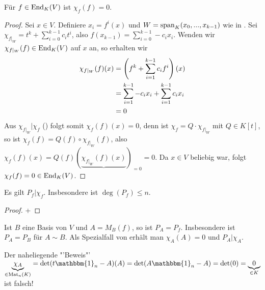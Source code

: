 \begin{theorem}
	Für $f\in\operatorname{End}_K(V)$ ist $\chi_f(f)=0$.
\end{theorem}
\begin{proof}
	Sei $x\in V$. Definiere $x_i=f^i(x)$ und $W=\operatorname{span}_K(x_0,...,x_{k-1})$ wie in . Sei $\chi_{f\vert_W}=t^k+\sum\limits_{i=0}^{k-1} c_it^i$, also $f(x_{k-1})=\sum\limits_{i=0}^{k-1} -c_ix_i$. Wenden wir $\chi_{f\vert_W}(f)\in\operatorname{End}_K(V)$ auf $x$ an, so erhalten wir 
	\begin{align}
		\chi_{f\vert_W}(f)(x)&=\left( f^k+\sum\limits_{i=1}^{k-1} c_if^i\right)(x)\notag \\
		&= \sum\limits_{i=1}^{k-1} -c_ix_i+\sum\limits_{i=1}^{k-1}c_ix_i\notag \\
		&= 0\notag
	\end{align}
	Aus $\chi_{f\vert_W}\vert \chi_f$ () folgt somit $\chi_f(f)(x)=0$, denn ist $\chi_f=Q\cdot \chi_{f\vert_W}$ mit $Q\in K[t]$, so ist $\chi_f(f)=Q(f)\circ\chi_{f\vert_W}(f)$, also $\chi_f(f)(x)=Q(f)(\underbrace{\chi_{f\vert_W}(f)(x)})_{=0}=0$. Da $x\in V$ beliebig war, folgt $\chi_f(f)=0\in\operatorname{End}_K(V)$.
\end{proof}

\begin{conclusion}
	Es gilt $P_f\vert \chi_f$. Insbesondere ist $\deg(P_f)\le n$.
\end{conclusion}
\begin{proof}
	 + 
\end{proof}

\begin{remark}
	Ist $B$ eine Basis von $V$ und $A=M_B(f)$, so ist $P_A=P_f$. Insbesondere ist $P_A=P_B$ für $A\sim B$. Als Spezialfall von  erhält man $\chi_A(A)=0$ und $P_A\vert \chi_A$.
\end{remark}

\begin{remark}
	Der naheliegende "'Beweis"' $\underbrace{\chi_A}_{\in\Mat_n(K)}=\det(t\mathbbm{1}_n-A)(A) =\det(A\mathbbm{1}_n-A)=\det(0)=\underbrace{0}_{\in K}$ ist falsch!
\end{remark}